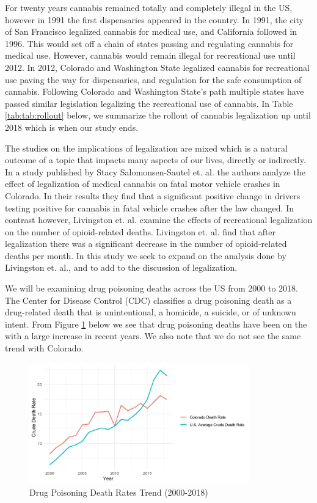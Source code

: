 \documentclass{article}
\begin{document}
For twenty years cannabis remained totally and completely illegal in the US, however in 1991 the first dispensaries appeared in the country. In 1991, the city of San Francisco legalized cannabis for medical use, and California followed in 1996. This would set off a chain of states passing and regulating cannabis for medical use. However, cannabis would remain illegal for recreational use until 2012. In 2012, Colorado and Washington State legalized cannabis for recreational use paving the way for dispensaries, and regulation for the safe consumption of cannabis. Following Colorado and Washington State’s path multiple states have passed similar legislation legalizing the recreational use of cannabis. In Table \ref{tab:tab:rollout} below, we summarize the rollout of cannabis legalization up until 2018 which is when our study ends.



The studies on the implications of legalization are mixed which is a natural outcome of a topic that impacts many aspects of our lives, directly or indirectly. In a study published by Stacy Salomonsen-Sautel et. al. the authors analyze the effect of legalization of medical cannabis on fatal motor vehicle crashes in Colorado. In their results they find that a significant positive change in drivers testing positive for cannabis in fatal vehicle crashes after the law changed. In contrast however, Livingston et. al. examine the effects of recreational legalization on the number of opioid-related deaths. Livingston et. al. find that after legalization there was a significant decrease in the number of opioid-related deaths per month. In this study we seek to expand on the analysis done by Livingston et. al., and to add to the discussion of legalization.

We will be examining drug poisoning deaths across the US from 2000 to 2018. The Center for Disease Control (CDC) classifies a drug poisoning death as a drug-related death that is unintentional, a homicide, a suicide, or of unknown intent. From Figure \ref{fig:death_rates_trend} below we see that drug poisoning deaths have been on the with a large increase in recent years. We also note that we do not see the same trend with Colorado.

\begin{figure}[H]
	\begin{center}
		\includegraphics[width=0.85\textwidth]{death_rates_trend}
	\end{center}
	\caption{Drug Poisoning Death Rates Trend (2000-2018)}
	\label{fig:death_rates_trend}
\end{figure}
\end{document}
